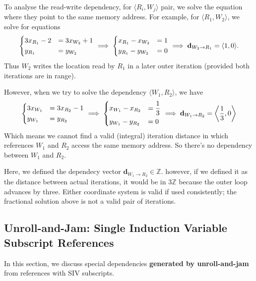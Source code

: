 To analyse the read-write dependency, for $\langle R_{i}, W_{j} \rangle$ pair,
we solve the equation where they point to the same memory address. For example,
for $\langle R_{1}, W_{2} \rangle$, we solve for equations
\[
\begin{dcases}
  3 x_{R_{1}} - 2 &= 3 x_{W_{2}} + 1 \\
  y_{R_{1}} &= y_{W_{2}}
\end{dcases}
\implies
\begin{dcases}
  x_{R_{1}} - x_{W_{2}} &= 1 \\
  y_{R_{1}} - y_{W_{2}} &= 0
\end{dcases}
\implies
\mathbf{d}_{W_{2} \rightarrow R_{1}} = \langle 1, 0 \rangle.
\]
Thus $W_{2}$ writes the location read by $R_{1}$ in a later outer
iteration (provided both iterations are in range).

However, when we try to solve the dependency $\langle W_{1}, R_{2} \rangle$, we
have
\[
\begin{dcases}
  3 x_{W_{1}} &= 3 x_{R_{2}} - 1 \\
  y_{W_{1}} &= y_{R_{2}}
\end{dcases}
\implies
\begin{dcases}
  x_{W_{1}} - x_{R_{2}} &= \frac{1}{3} \\
  y_{W_{1}} - y_{R_{2}} &= 0
\end{dcases}
\implies
\mathbf{d}_{W_{1} \rightarrow R_{2}} = \left\langle \frac{1}{3}, 0 \right\rangle
\]
Which means we cannot find a valid (integral) iteration distance in which
references $W_{1}$ and $R_{2}$ access the same memory address. So there's no
dependency between $W_{1}$ and $R_{2}$.

Here, we defined the dependecy vector $\mathbf{d}_{W_{1} \rightarrow R_{2}} \in
\mathbb{Z}$. however, if we defined it as the distance between actual
iterations, it would be in $3\mathbb{Z}$ because the outer loop advances by three.
Either coordinate system is valid if used consistently; the fractional
solution above is not a valid pair of iterations.

\subsection{Unroll-and-Jam: Single Induction Variable Subscript References}
\label{sec:ck94-siv-dependences}

In this section, we discuss special dependencies \textbf{generated by
unroll-and-jam} from references with SIV subscripts.

